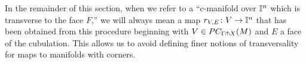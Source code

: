 In the remainder of this section, when we refer to a ``c-manifold over $\mathbb{I}^n$ which is transverse to the face $F$,'' we will always mean a map $r_{V,E} \colon V \to \mathbb{I}^n$ that has been obtained from this procedure beginning with $V \in PC_{\Gamma \pitchfork X}(M)$ and $E$ a face of the cubulation.
This allows us to avoid defining finer notions of transversality for maps to manifolds with corners.


\begin{comment}
Included in the following definition and lemma is a justification for referring to such an object as transverse to the faces of $\interval^n$.



\begin{definition}
	Let $F$ be a face of $\interval^n \subset \R^n$ and $U$ a c-manifold over $\interval^n$.
	We say $r_U$ is
	{\bf complementary} to $F$ at some $x$ in its image if it is transverse to the parallel translate of $F$ to $x$.
\end{definition}



\begin{lemma}\label{L:complement}
	Suppose $E$ is an $n$-dimensional cube in a cubulation of the manifold without boundary $M$ and that $V \in PC^*_{\Gamma \pf}(M)$.
	Let $F$ be a face of $E$.
	Then there is an open neighborhood $B$ of $F$ in $E$ such that $r_{V,E}$ is complementary to $F$ at every $x \in (r_{V,E})^{-1}(B)$.
\end{lemma}


\begin{proof}[Proof of Lemma~\ref{L:complement}]
	If $\dim(V) + \dim(F) < \dim(M)$ then, by transversality, $r_V$ is disjoint from $F$. So by \cref{L:proper nbhd} there is a neighborhood of $F$ in $M$, and hence a neighborhood of $F$ in $E$, that is disjoint from the image of $V$.

	Next suppose $\dim(V) + \dim(F) \geq \dim(M)$.
	Behavior of $V_E$ near the boundary of $E$, where we need to argue, could be delicate due to the corners introduced.
	But given $x \in V$ with $z = r_V(x) \in F$, we apply Lemma~\ref{L:charextension} to obtain a neighborhood $H$ of $z$ in
	$\R^n$ and an embedding $i_H \colon H \to M$ that agrees with $i_E$ on $H \cap E$. Thus the pull-back $V_H = V \times_M H \to H$ is a codimension zero open submanifold of $V$ which agrees with $V \times_E E \to E$ over $E \cap H$.

	The benefit of working with $V_H$ is that since $H$ does not have boundary, $V_H$ is stratified by the $S^k(V) \times_M H$, which we denote $V_H^k$.
	As we did for $E$, we will identify $H$ with its image in $M$, and so also identify $z$ with $z'$.
	Let us also write $r_{V,H}$ for the pull-back map $V_H \to H$ and $r_{V,H}^k$ for the restriction of $r_{V,H}$ to $V_H^k$.


\end{comment}
